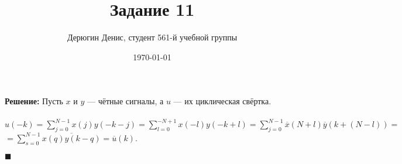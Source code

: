 \documentclass{article}
\title{Задание 11}
\author{
	Дерюгин Денис, студент 561-й учебной группы
}
\date{\today}
\newcommand\proofend{\begin{flushright}$\blacksquare$\end{flushright}}
\begin{document}
\maketitle
\large{
	\textbf{Решение:} Пусть $x$ и $y$ --- чётные сигналы, а $u$ --- их циклическая свёртка.\\ \\

	$u(-k) = \sum\limits_{j = 0}^{N - 1}x(j)y(-k - j) = \sum\limits_{l = 0}^{-N + 1} x(-l)y(-k + l) =
	\sum\limits_{j = 0}^{N - 1}\overline{x}(N + l) \overline{y}(k + (N - l)) = $\\
	$= \sum\limits_{s = 0}^{N - 1}\overline{x(q)y(k - q)} = \overline{u}(k)$.
	\proofend
}
\end{document}
